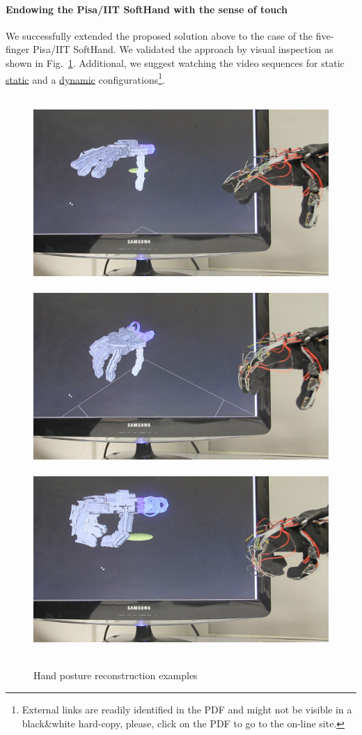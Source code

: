 \documentclass[a4paper,11pt,pdf]{pacmanreport}
\begin{document}




%
\paragraph{Endowing the Pisa/IIT SoftHand with the sense of touch}

We successfully extended the proposed solution above to the case of the five-finger Pisa/IIT SoftHand. We validated the approach by visual inspection as shown in Fig.~\ref{fig:hand_reconstruction_1}. Additional, we suggest watching the video sequences for static \href{https://www.youtube.com/watch?v=0oVha0Q1vWM}{static} and a \href{https://www.youtube.com/watch?v=bceOXa990-Q}{dynamic} configurations\footnote[1]{External links are readily identified in the PDF and might not be visible in a black\&white hard-copy, please, click on the PDF to go to the on-line site.}.

\begin{figure}
\centering
\mbox{
\includegraphics[width=0.33\linewidth]{Hand_Movement_1.png}
\includegraphics[width=0.33\linewidth]{Hand_Movement_2.png}
\includegraphics[width=0.33\linewidth]{Hand_Movement_3.png}
}
\caption{Hand posture reconstruction examples}
\label{fig:hand_reconstruction_1}
\end{figure}
\end{document}
